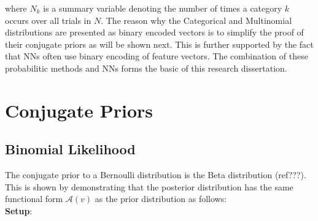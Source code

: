where $N_{k}$ is a summary variable denoting the number of times a category $k$ occurs over all trials in $N$. The reason why the Categorical and Multinomial distributions are presented as binary encoded vectors is to simplify the proof of their conjugate priors as will be shown next. This is further supported by the fact that NNs often use binary encoding of feature vectors. The combination of these probabilitic methods and NNs forms the basic of this research dissertation.






\section{Conjugate Priors}
\label{sec:probability:conjugate_priors}












\subsection{Binomial Likelihood}
\label{sec:probability:conjugate_priors:binom_likelihood}

The conjugate prior to a Bernoulli distribution is the Beta distribution
(ref???). This is shown by demonstrating that the posterior distribution has the
same functional form $\mathcal{A}(v)$ as the prior distribution as follows: \\
\textbf{Setup}:

